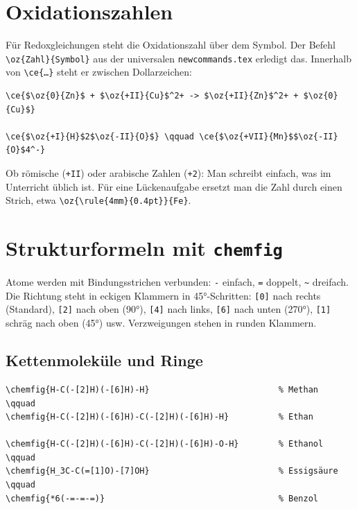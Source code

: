 \section{Oxidationszahlen}

Für Redoxgleichungen steht die Oxidationszahl über dem Symbol. Der Befehl \texttt{\textbackslash oz\{Zahl\}\{Symbol\}} aus der universalen \texttt{newcommands.tex} erledigt das. Innerhalb von \texttt{\textbackslash ce\{\dots\}} steht er zwischen Dollarzeichen:

\begin{lstlisting}[style=latex]
\ce{$\oz{0}{Zn}$ + $\oz{+II}{Cu}$^2+ -> $\oz{+II}{Zn}$^2+ + $\oz{0}{Cu}$}

\ce{$\oz{+I}{H}$2$\oz{-II}{O}$} \qquad \ce{$\oz{+VII}{Mn}$$\oz{-II}{O}$4^-}
\end{lstlisting}

\begin{ausgabe}

	 \qquad {}
\end{ausgabe}

Ob römische (\texttt{+II}) oder arabische Zahlen (\texttt{+2}): Man schreibt einfach, was im Unterricht üblich ist. Für eine Lückenaufgabe ersetzt man die Zahl durch einen Strich, etwa \texttt{\textbackslash oz\{\textbackslash rule\{4mm\}\{0.4pt\}\}\{Fe\}}.



\section{Strukturformeln mit \texttt{chemfig}}

Atome werden mit Bindungsstrichen verbunden: \texttt{-} einfach, \texttt{=} doppelt, \texttt{\textasciitilde} dreifach. Die Richtung steht in eckigen Klammern in 45°-Schritten: \texttt{[0]} nach rechts (Standard), \texttt{[2]} nach oben (90°), \texttt{[4]} nach links, \texttt{[6]} nach unten (270°), \texttt{[1]} schräg nach oben (45°) usw. Verzweigungen stehen in runden Klammern.


\subsection{Kettenmoleküle und Ringe}

\begin{lstlisting}[style=latex]
\chemfig{H-C(-[2]H)(-[6]H)-H}                          % Methan
\qquad
\chemfig{H-C(-[2]H)(-[6]H)-C(-[2]H)(-[6]H)-H}          % Ethan

\chemfig{H-C(-[2]H)(-[6]H)-C(-[2]H)(-[6]H)-O-H}        % Ethanol
\qquad
\chemfig{H_3C-C(=[1]O)-[7]OH}                          % Essigsäure
\qquad
\chemfig{*6(-=-=-=)}                                   % Benzol
\end{lstlisting}

